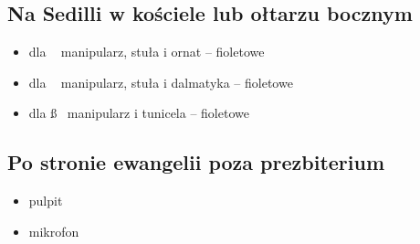 

\subsection{Na Sedilli w kościele lub ołtarzu bocznym}
\begin{itemize}
	\item dla \ii~ manipularz, stuła i ornat – {\color{violet}fioletowe}
	\item dla \dd~ manipularz, stuła i dalmatyka – {\color{violet}fioletowe}
	\item dla \ss~ manipularz i tunicela – {\color{violet}fioletowe}
\end{itemize}

\subsection{Po stronie ewangelii poza prezbiterium}
\begin{itemize}
	\item pulpit
	\item mikrofon
\end{itemize}
